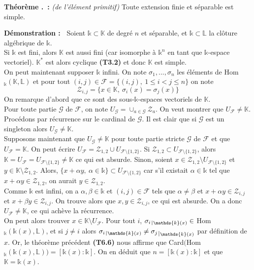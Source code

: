 \documentclass[5pt,a4paper]{article}
\newcounter{thmcounter}[subsection]
\renewcommand{\thethmcounter}{\thesubsection.\arabic{thmcounter}}
\newcommand{\thm}[1]{
    \stepcounter{thmcounter}
    \hypertarget{t:\thethmcounter}{}%
    \noindent\textbf{Théorème \thethmcounter ~:} #1 \newline
}
\newcommand{\demo}[1]{
    \textbf{Démonstration :~} #1 \newline
}
\def\restriction#1#2{\mathchoice
              {\setbox1\hbox{${\displaystyle #1}_{\scriptstyle #2}$}
              \restrictionaux{#1}{#2}}
              {\setbox1\hbox{${\textstyle #1}_{\scriptstyle #2}$}
              \restrictionaux{#1}{#2}}
              {\setbox1\hbox{${\scriptstyle #1}_{\scriptscriptstyle #2}$}
              \restrictionaux{#1}{#2}}
              {\setbox1\hbox{${\scriptscriptstyle #1}_{\scriptscriptstyle #2}$}
              \restrictionaux{#1}{#2}}}
\def\restrictionaux#1#2{{#1\,\smash{\vrule height .8\ht1 depth .85\dp1}}_{\,#2}}
\begin{document}
\begin{onehalfspacing}
\thm{\textit{(de l'élément primitif)} Toute extension finie et séparable est simple.}
\demo{Soient $\mathds{k} \subset \mathbb{K}$ de degré $n$ et séparable, et $\mathds{k} \subset \mathbb{L}$ la clôture algébrique de $\mathds{k}$. 
\\Si $\mathds{k}$ est fini, alors $\mathbb{K}$ est aussi fini (car isomorphe à $\mathds{k}^n$ en tant que $\mathds{k}$-espace vectoriel). $\mathbb{K}^*$ est alors cyclique \textbf{(T3.2)} et donc $\mathbb{K}$ est simple. 
\\On peut maintenant supposer $\mathds{k}$ infini. On note $\sigma_1, ..., \sigma_n$ les éléments de Hom$_{\mathds{k}}(\mathbb{K}, \mathbb{L})$ et pour tout $(i,j) \in \mathcal{F} = \{(i,j),~1 \leq i < j \leq n\}$ on note 
\[ \mathcal{Z}_{i,j} = \{x \in \mathbb{K},~\sigma_i(x) = \sigma_j(x)\}\]
On remarque d'abord que ce sont des sous-$\mathds{k}$-espaces vectoriels de $\mathbb{K}$. 
\\Pour toute partie $\mathcal{G}$ de $\mathcal{F}$, on note $U_\mathcal{G} = \cup_{a \in \mathcal{G}} \mathcal{Z}_a$. On veut montrer que $U_\mathcal{F} \neq \mathbb{K}$. Procédons par récurrence sur le cardinal de $\mathcal{G}$. Il est clair que si $\mathcal{G}$ est un singleton alors $U_\mathcal{G} \neq \mathbb{K}$. 
\\Supposons maintenant que $U_\mathcal{G} \neq \mathbb{K}$ pour toute partie stricte $\mathcal{G}$ de $\mathcal{F}$ et que $U_\mathcal{F} = \mathbb{K}$. On peut écrire $U_\mathcal{F} = \mathcal{Z}_{1, 2} \cup U_{\mathcal{F} \setminus \{1, 2\}}$. Si $\mathcal{Z}_{1, 2} \subset U_{\mathcal{F} \setminus \{1, 2\}}$, alors $\mathbb{K} = U_\mathcal{F} = U_{\mathcal{F} \setminus \{1, 2\}} \neq \mathbb{K}$ ce qui est absurde. Sinon, soient $x \in \mathcal{Z}_{1, 2} \setminus U_{\mathcal{F} \setminus \{1, 2\}}$ et $y \in \mathbb{K} \setminus \mathcal{Z}_{1, 2}$. Alors, $\{x + \alpha y,~\alpha \in \mathds{k}\} \subset U_{\mathcal{F} \setminus \{1, 2\}}$ car s'il existait $\alpha \in \mathds{k}$ tel que $x + \alpha y \in \mathcal{Z}_{1,2}$, on aurait $y \in \mathcal{Z}_{1, 2}$. 
\\Comme $\mathds{k}$ est infini, on a $\alpha, \beta \in \mathds{k}$ et $(i, j) \in \mathcal{F}$ tels que $\alpha \neq \beta$ et $x + \alpha y \in \mathcal{Z}_{i, j}$ et $x + \beta y \in \mathcal{Z}_{i, j}$. On trouve alors que $x, y \in \mathcal{Z}_{i, j}$, ce qui est absurde. On a donc $U_\mathcal{F} \neq \mathbb{K}$, ce qui achève la récurrence. 
\\On peut alors trouver $x \in \mathbb{K} \setminus U_\mathcal{F}$. Pour tout $i$, $\restriction{\sigma_i}{\mathds{k}(x)} \in $ Hom$_{\mathds{k}}(\mathds{k}(x), \mathbb{L})$, et si $j \neq i$ alors $\restriction{\sigma_i}{\mathds{k}(x)} \neq \restriction{\sigma_j}{\mathds{k}(x)}$ par définition de $x$. Or, le théorème précédent \textbf{(T6.6)} nous affirme que Card$($Hom$_{\mathds{k}}(\mathds{k}(x), \mathbb{L})) = [\mathds{k}(x) : \mathds{k}]$. On en déduit que $n = [\mathds{k}(x) : \mathds{k}]$ et que $\mathbb{K} = \mathds{k}(x)$.}



\end{onehalfspacing}
\end{document}
